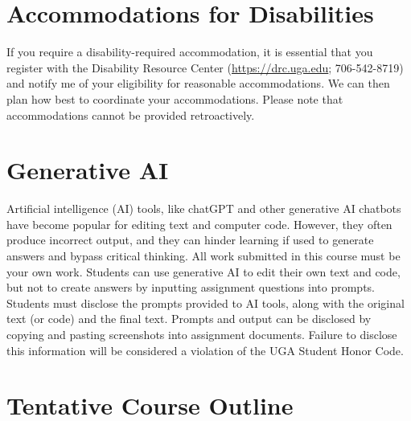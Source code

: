 \documentclass[12pt]{article}
\begin{document}
\section*{\normalsize Accommodations for Disabilities}
\vspace{-4mm}

If you require a disability-required accommodation, it is essential
that you register with the Disability Resource Center
(\url{https://drc.uga.edu}; 706-542-8719) 
and notify me of your eligibility for reasonable accommodations. We
can then plan how best to coordinate your accommodations. Please note
that accommodations cannot be provided retroactively.



\section*{\normalsize Generative AI}
\vspace{-4mm}


Artificial intelligence (AI) tools, like chatGPT and other generative AI
chatbots have become popular for editing text and computer code. However,
they often produce incorrect output, and they can hinder learning if
used to generate answers and bypass critical thinking. All work
submitted in this course must be your own work. Students can use
generative AI to edit their own text and code, but not to create
answers by inputting assignment questions into prompts. Students must
disclose the prompts provided to  AI tools, along with the original
text (or code) and the final text. Prompts and output can be disclosed
by copying and pasting screenshots into assignment documents. Failure
to disclose this information will be considered a violation of the UGA
Student Honor Code. 


\clearpage

\section*{\normalsize Tentative Course Outline}
\end{document}
